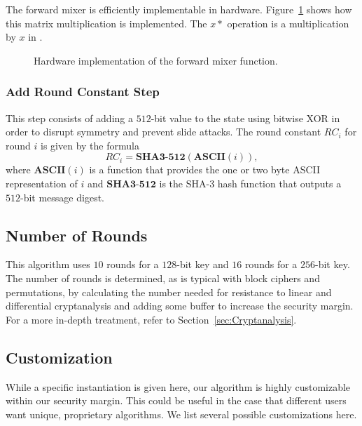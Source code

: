 The forward mixer is efficiently implementable in hardware.
Figure~\ref{fig:MixerMatrix} shows how this matrix multiplication is implemented.
The $x*$ operation is a multiplication by $x$ in \gfsixteen.

\begin{figure}[ht]
\centering

\caption{Hardware implementation of the forward mixer function.}
\label{fig:MixerMatrix}
\end{figure}

\begin{comment}
\begin{figure}[ht]
\centering

\caption{Hardware implementation of the $x*$ function. The leftmost bit is the MSB.}
\label{fig:xTimes}
\end{figure}
\end{comment}

\subsubsection{Add Round Constant Step}
This step consists of adding a $512$-bit value to the state using bitwise XOR in order to disrupt symmetry and prevent slide attacks.
The round constant $RC_i$ for round $i$ is given by the formula
\begin{equation*}
RC_i = \mathbf{SHA3\textbf{-}512}(\mathbf{ASCII}(i)),
\end{equation*}
where $\mathbf{ASCII}(i)$ is a function that provides the one or two byte ASCII representation of $i$ and $\mathbf{SHA3\textbf{-}512}$ is the SHA-3 hash function that outputs a $512$-bit message digest. 

\subsection{Number of Rounds}
This algorithm uses $10$ rounds for a $128$-bit key and $16$ rounds for a $256$-bit key.
The number of rounds is determined, as is typical with block ciphers and permutations, by calculating the number needed for resistance to linear and differential cryptanalysis and adding some buffer to increase the security margin. 
For a more in-depth treatment, refer to Section~\ref{sec:Cryptanalysis}.

\subsection{Customization}
While a specific instantiation is given here, our algorithm is highly customizable within our security margin.
This could be useful in the case that different users want unique, proprietary algorithms.
We list several possible customizations here.

